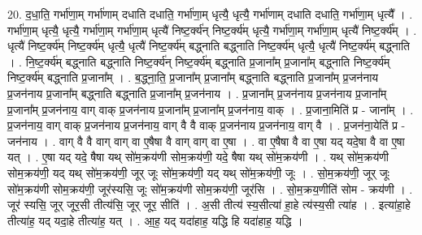 \documentclass[17pt]{extarticle}
\begin{document}
20. द॒धा॒ति॒ गर्भा॑णा॒म् गर्भा॑णाम् दधाति दधाति॒ गर्भा॑णा॒म् धृत्यै॒ धृत्यै॒ गर्भा॑णाम् दधाति दधाति॒ गर्भा॑णा॒म् धृत्यै᳚ । . गर्भा॑णा॒म् धृत्यै॒ धृत्यै॒ गर्भा॑णा॒म् गर्भा॑णा॒म् धृत्यै॑ निष्ट॒र्क्य॑न् निष्ट॒र्क्य॑म् धृत्यै॒ गर्भा॑णा॒म् गर्भा॑णा॒म् धृत्यै॑ निष्ट॒र्क्य᳚म् । . धृत्यै॑ निष्ट॒र्क्य॑म् निष्ट॒र्क्य॑म् धृत्यै॒ धृत्यै॑ निष्ट॒र्क्य॑म् बद्ध्नाति बद्ध्नाति निष्ट॒र्क्य॑म् धृत्यै॒ धृत्यै॑ निष्ट॒र्क्य॑म् बद्ध्नाति । . नि॒ष्ट॒र्क्य॑म् बद्ध्नाति बद्ध्नाति निष्ट॒र्क्य॑न् निष्ट॒र्क्य॑म् बद्ध्नाति प्र॒जाना᳚म् प्र॒जाना᳚म् बद्ध्नाति निष्ट॒र्क्य॑म् निष्ट॒र्क्य॑म् बद्ध्नाति प्र॒जाना᳚म् । . ब॒द्ध्ना॒ति॒ प्र॒जाना᳚म् प्र॒जाना᳚म् बद्ध्नाति बद्ध्नाति प्र॒जाना᳚म् प्र॒जन॑नाय प्र॒जन॑नाय प्र॒जाना᳚म् बद्ध्नाति बद्ध्नाति प्र॒जाना᳚म् प्र॒जन॑नाय । . प्र॒जाना᳚म् प्र॒जन॑नाय प्र॒जन॑नाय प्र॒जाना᳚म् प्र॒जाना᳚म् प्र॒जन॑नाय॒ वाग् वाक् प्र॒जन॑नाय प्र॒जाना᳚म् प्र॒जाना᳚म् प्र॒जन॑नाय॒ वाक् । . प्र॒जाना॒मिति॑ प्र - जाना᳚म् । . प्र॒जन॑नाय॒ वाग् वाक् प्र॒जन॑नाय प्र॒जन॑नाय॒ वाग् वै वै वाक् प्र॒जन॑नाय प्र॒जन॑नाय॒ वाग् वै । . प्र॒जन॑ना॒येति॑ प्र - जन॑नाय । . वाग् वै वै वाग् वाग् वा ए॒षैषा वै वाग् वाग् वा ए॒षा । . वा ए॒षैषा वै वा ए॒षा यद् यदे॒षा वै वा ए॒षा यत् । . ए॒षा यद् यदे॒ षैषा यथ् सो॑म॒क्रय॑णी सोम॒क्रय॑णी॒ यदे॒ षैषा यथ् सो॑म॒क्रय॑णी । . यथ् सो॑म॒क्रय॑णी सोम॒क्रय॑णी॒ यद् यथ् सो॑म॒क्रय॑णी॒ जूर् जूः सो॑म॒क्रय॑णी॒ यद् यथ् सो॑म॒क्रय॑णी॒ जूः । . सो॒म॒क्रय॑णी॒ जूर् जूः सो॑म॒क्रय॑णी सोम॒क्रय॑णी॒ जूर॑स्यसि॒ जूः सो॑म॒क्रय॑णी सोम॒क्रय॑णी॒ जूर॑सि । . सो॒म॒क्रय॒णीति॑ सोम - क्रय॑णी । . जूर॑ स्यसि॒ जूर् जूर॒सी तीत्य॑सि॒ जूर् जूर॒ सीति॑ । . अ॒सी तीत्य॑ स्य॒सीत्या॑ हा॒हे त्य॑स्य॒सी त्या॑ह । . इत्या॑हा॒हे तीत्या॑ह॒ यद् यदा॒हे तीत्या॑ह॒ यत् । . आ॒ह॒ यद् यदा॑हाह॒ यद्धि हि यदा॑हाह॒ यद्धि । \newline
\end{document}
